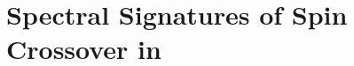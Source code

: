 



\section[Spectral Signatures of Spin Crossover in \protect{[Fe\textsuperscript{II}(bpy)\textsubscript{3}](PF\textsubscript{6})\textsubscript{2}}]{Spectral Signatures of Spin Crossover in \\ }
\label{sec: TA-BPY}


